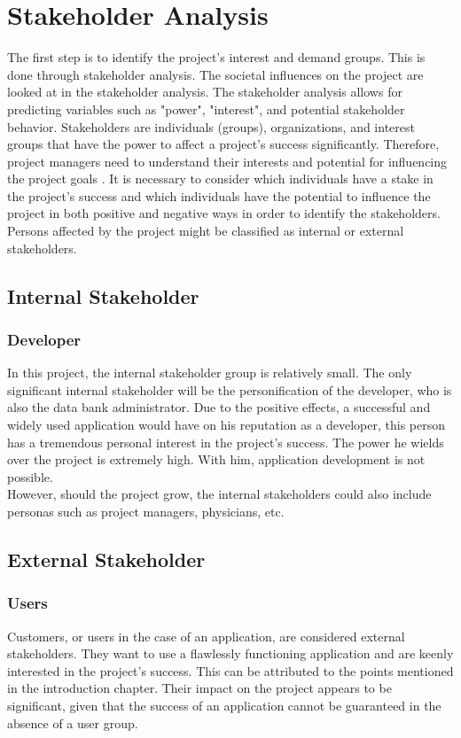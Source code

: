\section{Stakeholder Analysis}
The first step is to identify the project's interest and demand groups. This is done through stakeholder analysis. The societal influences on the project are looked at in the stakeholder analysis. The stakeholder analysis allows for predicting variables such as "power", "interest", and potential stakeholder behavior. Stakeholders are individuals (groups), organizations, and interest groups that have the power to affect a project's success significantly. Therefore, project managers need to understand their interests and potential for influencing the project goals \cite[p. 28]{.stakeholder}. It is necessary to consider which individuals have a stake in the project's success and which individuals have the potential to influence the project in both positive and negative ways in order to identify the stakeholders. Persons affected by the project might be classified as internal or external stakeholders. 

\subsection{Internal Stakeholder}
\subsubsection{Developer}
In this project, the internal stakeholder group is relatively small. The only significant internal stakeholder will be the personification of the developer, who is also the data bank administrator. Due to the positive effects, a successful and widely used application would have on his reputation as a developer, this person has a tremendous personal interest in the project's success. The power he wields over the project is extremely high. With him, application development is not possible.
\newline \\ 
However, should the project grow, the internal stakeholders could also include personas such as project managers, physicians, etc.
\subsection{External Stakeholder}
\subsubsection{Users}
Customers, or users in the case of an application, are considered external stakeholders. They want to use a flawlessly functioning application and are keenly interested in the project's success. This can be attributed to the points mentioned in the introduction chapter. Their impact on the project appears to be significant, given that the success of an application cannot be guaranteed in the absence of a user group.

